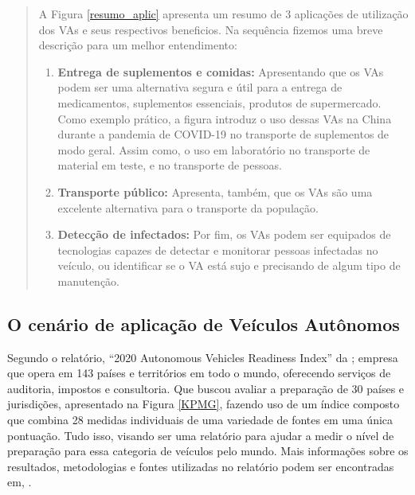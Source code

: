 \begin{quote}

A Figura \ref{resumo_aplic} apresenta um resumo de 3 aplicações de utilização dos VAs e seus respectivos beneficios. Na sequência fizemos uma breve descrição para um melhor entendimento:

\begin{enumerate}
 \item \textbf{Entrega de suplementos e comidas:} Apresentando que os VAs podem ser uma alternativa segura e útil para a entrega de medicamentos, suplementos essenciais, produtos de supermercado. Como exemplo prático, a figura introduz o uso dessas VAs na China durante a pandemia de COVID-19 no transporte de suplementos de modo geral. Assim como, o uso em laboratório no transporte de material em teste, e no transporte de pessoas.

\item \textbf{Transporte público:} Apresenta, também, que os VAs são uma excelente alternativa para o transporte da população. 

\item \textbf{Detecção de infectados:} Por fim, os VAs podem ser equipados de tecnologias capazes de detectar e monitorar pessoas infectadas no veículo, ou identificar se o VA está sujo e precisando de algum tipo de manutenção. 

\end{enumerate}

\end{quote}

\subsection{O cenário de aplicação de Veículos Autônomos}
Segundo o relatório, “2020 Autonomous Vehicles Readiness Index” da \cite{KPMG}; empresa que opera em 143 países e territórios em todo o mundo, oferecendo serviços de auditoria, impostos e consultoria.
Que buscou avaliar a preparação de 30 países e jurisdições, apresentado na Figura \ref{KPMG}, fazendo uso de um índice composto que combina 28 medidas individuais de uma variedade de fontes em uma única pontuação. Tudo isso, visando ser uma relatório para ajudar a medir o nível de preparação para essa categoria de veículos pelo mundo. Mais informações sobre os resultados, metodologias e fontes utilizadas no relatório podem ser encontradas em, \cite{KPMG}.

